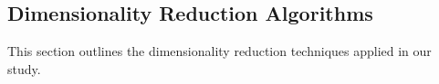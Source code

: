 \subsection{Dimensionality Reduction Algorithms}
\label{subsec:methods-reduction}

This section outlines the dimensionality reduction techniques applied in our study.


